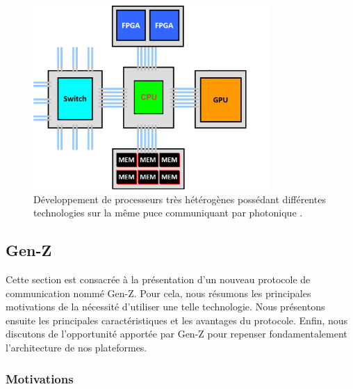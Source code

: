           \begin{figure}
        \center
        \includegraphics[width=9cm]{images/edl_hetero_chip.png}
        \caption{\label{fig:edl_hetero_chip}Développement de processeurs très hétérogènes possédant différentes technologies sur la même puce communiquant par photonique \cite{Bergman2018}.}
        \end{figure}
            
      

      


\subsection{Gen-Z}\label{sec:gen_z}
    
    Cette section est consacrée à la présentation d'un nouveau protocole de communication nommé Gen-Z. Pour cela, nous résumons les principales motivations de la nécessité d'utiliser une telle technologie. Nous présentons ensuite les principales caractéristiques et les avantages du protocole. Enfin, nous discutons de l'opportunité apportée par Gen-Z pour repenser fondamentalement l'architecture de nos plateformes.
        
    \subsubsection{Motivations}

